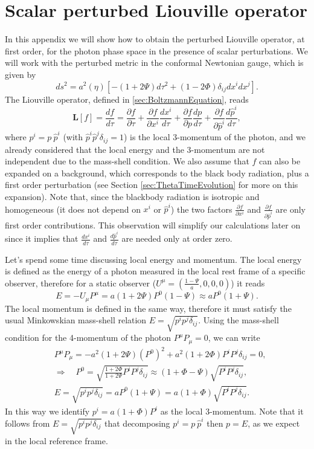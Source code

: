 \section{Scalar perturbed Liouville operator}\label{app:scalarPerturbedLiouvilleOperator}
In this appendix we will show how to obtain the perturbed Liouville operator, at first order, for the photon phase space in the presence of scalar perturbations. We will work with the perturbed metric in the conformal Newtonian gauge, which is given by
$$ds^2=a^2(\eta)\left[-(1+2\Psi)d\tau^2+(1-2\Phi)\delta_{ij}dx^idx^j\right].$$
The Liouville operator, defined in \ref{sec:BoltzmannEquation}, reads
$$\hat{\mathbf{L}}[f]=\frac{df}{d\tau}=\frac{\partial f}{\partial \tau}+\frac{\partial f}{\partial x^i}\frac{d x^i}{d\tau}+\frac{\partial f}{\partial p}\frac{d p}{d\tau}+\frac{\partial f}{\partial \hat p^i}\frac{d \hat p^i}{d\tau},$$
where $p^i=p\ \hat p^i$ (with $\hat p^i\hat p^j\delta_{ij}=1$) is the local 3-momentum of the photon, and we already considered that the local energy and the 3-momentum are not independent due to the mass-shell condition. We also assume that $f$ can also be expanded on a background, which corresponds to the black body radiation, plus a first order perturbation (see Section \ref{sec:ThetaTimeEvolution} for more on this expansion). Note that, since the blackbody radiation is isotropic and homogeneous (it does not depend on $x^i$ or $\hat p^i$) the two factors $\frac{\partial f}{\partial x^i}$ and $\frac{\partial f}{\partial \hat p^i}$ are only first order contributions. This observation will simplify our calculations later on since it implies that $\frac{dx^i}{d\tau}$ and $\frac{d\hat p^i}{d\tau}$ are needed only at order zero.

Let's spend some time discussing local energy and momentum. The local energy is defined as the energy of a photon measured in the local rest frame of a specific observer, therefore for a static observer ($U^\mu=(\frac{1-\Psi}{a},0,0,0)$) it reads
$$E=-U_\mu P^\mu=a(1+2\Psi)P^0(1-\Psi)\approx aP^0(1+\Psi).$$
The local momentum is defined in the same way, therefore it must satisfy the usual Minkowskian mass-shell relation $E=\sqrt{p^ip^j\delta_{ij}}$. Using the mass-shell condition for the 4-momentum of the photon $P^\mu P_\mu=0$, we can write
\begin{align*}
    &P^\mu P_\mu=-a^2(1+2\Psi)(P^0)^2+a^2(1+2\Phi)P^iP^j\delta_{ij}=0,\\
    &\Rightarrow\quad P^0=\sqrt{\frac{1+2\Phi}{1+2\Psi}P^iP^j\delta_{ij}}\approx(1+\Phi-\Psi)\sqrt{P^iP^j\delta_{ij}},\\
    &E=\sqrt{p^ip^j\delta_{ij}}=aP^0(1+\Psi)=a(1+\Phi)\sqrt{P^iP^j\delta_{ij}}.
\end{align*}
In this way we identify $p^i=a(1+\Phi)P^i$ as the local 3-momentum. Note that it follows from $E=\sqrt{p^ip^j\delta_{ij}}$ that decomposing $p^i=p\ \hat p^i$ then $p=E$, as we expect in the local reference frame.

